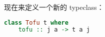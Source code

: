 \documentclass[./main.tex]{subfiles}
\begin{document}
现在来定义一个新的 typeclass：

\begin{lstlisting}[language=Haskell]
  class Tofu t where
    tofu :: j a -> t a j
\end{lstlisting}







\end{document}
